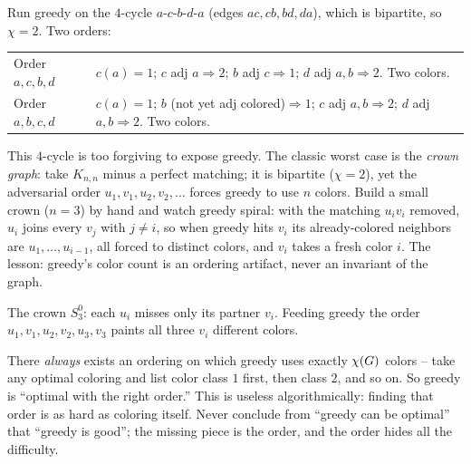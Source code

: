 \begin{labbox}
Run greedy on the $4$-cycle $a$-$c$-$b$-$d$-$a$ (edges $ac,cb,bd,da$), which is
bipartite, so $\chi=2$. Two orders:
\begin{center}
\begin{tabular}{ll}
\toprule
Order $a,c,b,d$ & $c(a)=1$; $c$ adj $a\Rightarrow 2$; $b$ adj $c\Rightarrow 1$; $d$ adj $a,b\Rightarrow 2$. Two colors.\\
Order $a,b,c,d$ & $c(a)=1$; $b$ (not yet adj colored)$\Rightarrow 1$; $c$ adj $a,b\Rightarrow 2$; $d$ adj $a,b\Rightarrow 2$. Two colors.\\
\bottomrule
\end{tabular}
\end{center}
This $4$-cycle is too forgiving to expose greedy. The classic worst case is the
\emph{crown graph}: take $K_{n,n}$ minus a perfect matching; it is bipartite
($\chi=2$), yet the adversarial order $u_1,v_1,u_2,v_2,\dots$ forces greedy to use
$n$ colors. Build a small crown ($n=3$) by hand and watch greedy spiral: with the
matching $u_iv_i$ removed, $u_i$ joins every $v_j$ with $j\neq i$, so when greedy
hits $v_i$ its already-colored neighbors are $u_1,\dots,u_{i-1}$, all forced to
distinct colors, and $v_i$ takes a fresh color $i$. The lesson:
greedy's color count is an ordering artifact, never an invariant of the graph.
\begin{center}
\end{center}
The crown $S_3^0$: each $u_i$ misses only its partner $v_i$. Feeding greedy the order
$u_1,v_1,u_2,v_2,u_3,v_3$ paints all three $v_i$ different colors.
\end{labbox}

\begin{trapbox}
There \emph{always} exists an ordering on which greedy uses exactly $\chi(G)$
colors -- take any optimal coloring and list color class $1$ first, then class $2$,
and so on. So greedy is ``optimal with the right order.'' This is useless
algorithmically: finding that order is as hard as coloring itself. Never conclude
from ``greedy can be optimal'' that ``greedy is good''; the missing piece is the
order, and the order hides all the difficulty.
\end{trapbox}

